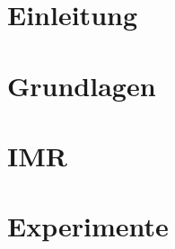 \documentclass[12pt,twoside]{article}
\theoremstyle{plain}
\theoremstyle{definition}
\theoremstyle{remark}
\begin{document}
\section{Einleitung}

\section{Grundlagen} 

\section{IMR}\label{sec:IMR}
\label{sec:methods}

\section{Experimente}


%


\end{document}
